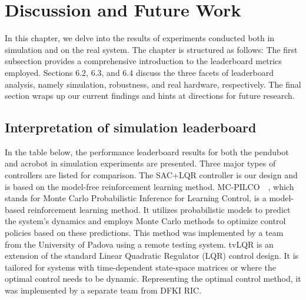 \chapter{Discussion and Future Work}
In this chapter, we delve into the results of experiments conducted both in simulation and on the real system. The chapter is structured as follows: The first subsection provides a comprehensive introduction to the leaderboard metrics employed. Sections 6.2, 6.3, and 6.4 discuss the three facets of leaderboard analysis, namely simulation, robustness, and real hardware, respectively. The final section wraps up our current findings and hints at directions for future research.

\section{Interpretation of simulation leaderboard}
In the table below, the performance leaderboard results for both the pendubot and acrobot in simulation experiments are presented. Three major types of controllers are listed for comparison. The SAC+LQR controller is our design and is based on the model-free reinforcement learning method. MC-PILCO~\cite{amadio2022model}~\cite{Libera2023AthleticIO}, which stands for Monte Carlo Probabilistic Inference for Learning Control, is a model-based reinforcement learning method. It utilizes probabilistic models to predict the system's dynamics and employs Monte Carlo methods to optimize control policies based on these predictions. This method was implemented by a team from the University of Padova using a remote testing system. tvLQR is an extension of the standard Linear Quadratic Regulator (LQR) control design. It is tailored for systems with time-dependent state-space matrices or where the optimal control needs to be dynamic. Representing the optimal control method, it was implemented by a separate team from DFKI RIC.

